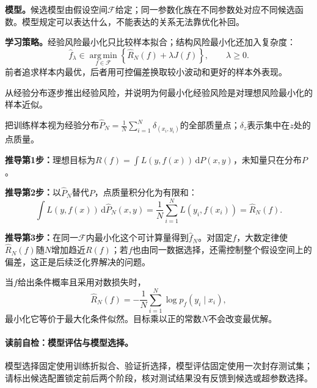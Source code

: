 \label{struct:V1-C10-CH08}
\textbf{模型。}候选模型由假设空间$\mathcal F$给定；同一参数化族在不同参数处对应不同候选函数。模型规定可以表达什么，不能表达的关系无法靠优化补回。

\label{struct:V1-C10-CH09}
\textbf{学习策略。}经验风险最小化只比较样本拟合；结构风险最小化还加入复杂度：
\[
\widehat f_{\lambda}\in\operatorname*{arg\,min}_{f\in\mathcal F}
\left\{\widehat R_N(f)+\lambda J(f)\right\},\qquad \lambda\ge0.
\]
前者追求样本内最优，后者用可控偏差换取较小波动和更好的样本外表现。

\label{struct:V1-C10-CH11}

\begin{derivationgoalbox}
从经验分布逐步推出经验风险，并说明为何最小化经验风险是对理想风险最小化的样本近似。
\end{derivationgoalbox}
\begin{derivationprepbox}
把训练样本视为经验分布$\widehat P_N=\frac1N\sum_{i=1}^N\delta_{(x_i,y_i)}$的全部质量点；$\delta_z$表示集中在$z$处的点质量。
\end{derivationprepbox}
\textbf{推导第1步：}理想目标为$R(f)=\int L(y,f(x))\,\mathrm dP(x,y)$，未知量只在分布$P$。

\textbf{推导第2步：}以$\widehat P_N$替代$P$，点质量积分化为有限和：
\[
\int L(y,f(x))\,\mathrm d\widehat P_N(x,y)
=\frac1N\sum_{i=1}^N L(y_i,f(x_i))=\widehat R_N(f).
\]

\textbf{推导第3步：}在同一$\mathcal F$内最小化这个可计算量得到$\widehat f_N$。对固定$f$，大数定律使$\widehat R_N(f)$随$N$增加趋近$R(f)$；若$f$也由同一数据选择，还需控制整个假设空间上的偏差，这正是后续泛化界解决的问题。

当$f$给出条件概率且采用对数损失时，
\[
\widehat R_N(f)=-\frac1N\sum_{i=1}^N\log p_f(y_i\mid x_i),
\]
最小化它等价于最大化条件似然。目标乘以正的常数$N$不会改变最优解。


\paragraph{读前自检：模型评估与模型选择。}模型选择固定使用训练折拟合、验证折选择，模型评估固定使用一次封存测试集；请标出候选配置锁定前后两个阶段，核对测试结果没有反馈到候选或超参数选择。\par


